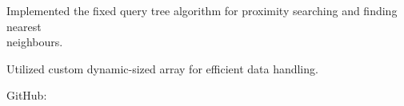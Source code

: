 \begin{resume_list}
  \item Implemented the fixed query tree algorithm for proximity searching and finding nearest \\
  neighbours.
  \item Utilized custom dynamic-sized array for efficient data handling.
  \item GitHub: 
\end{resume_list}
